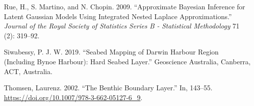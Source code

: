 \documentclass[a4paper]{article}
\begin{document}
\leavevmode\hypertarget{ref-Rue-2009-319}{}%
Rue, H., S. Martino, and N. Chopin. 2009. ``Approximate Bayesian
Inference for Latent Gaussian Models Using Integrated Nested Laplace
Approximations.'' \emph{Journal of the Royal Society of Statistics
Series B - Statistical Methodology} 71 (2): 319--92.

\leavevmode\hypertarget{ref-Siwabessy-2019}{}%
Siwabessy, P. J. W. 2019. ``Seabed Mapping of Darwin Harbour Region
(Including Bynoe Harbour): Hard Seabed Layer.'' Geoscience Australia,
Canberra, ACT, Australia.

\leavevmode\hypertarget{ref-Thomsen-2002-2002}{}%
Thomsen, Laurenz. 2002. ``The Benthic Boundary Layer.'' In, 143--55.
\url{https://doi.org/10.1007/978-3-662-05127-6_9}.
%


\end{document}
